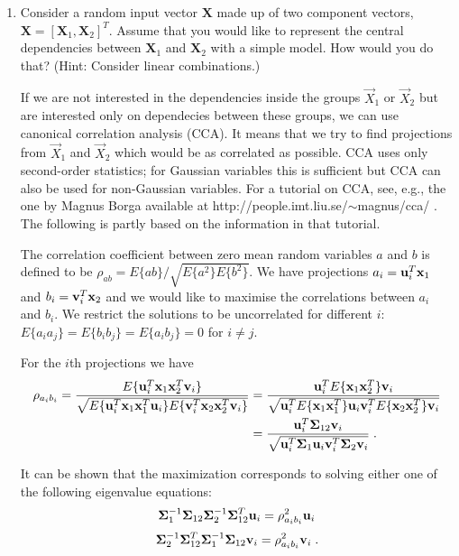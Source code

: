 \begin{enumerate}

\item Consider a random input vector $\mathbf{X}$ made up of two component vectors,
  $\mathbf{X} = [\mathbf{X}_1,\mathbf{X}_2]^T$. Assume that you would like to represent the
  central dependencies between $\mathbf{X}_1$ and $\mathbf{X}_2$ with a  simple
  model. How would you do that? (Hint: Consider linear combinations.)

  \begin{solution}

    If we are not interested in the dependencies inside the groups
    $\vec{X}_1$ or $\vec{X}_2$ but are interested only on dependecies
    between these groups, we can use canonical correlation analysis (CCA).  It
    means that we try to find projections from $\vec{X}_1$ and
    $\vec{X}_2$ which would be as correlated as possible. CCA uses only
    second-order statistics; for Gaussian variables this
    is sufficient but CCA can also be used for
    non-Gaussian variables. For a tutorial on CCA, see,
    e.g., the one by Magnus Borga available
    at http://people.imt.liu.se/$\sim$magnus/cca/ . The following is
    partly based on the information in that tutorial.

    The correlation coefficient between zero mean random variables $a$
    and $b$ is defined to be $\rho_{ab} =
    E\{ab\}/\sqrt{E\{a^2\}E\{b^2\}}$.  We have projections $a_i = \mathbf{u}_i^T
    \mathbf{x}_1$ and $b_i = \mathbf{v}_i^T \mathbf{x}_2$ and we would like to maximise the
    correlations between $a_i$ and $b_i$. We restrict the solutions to be
    uncorrelated for different $i$: $E\{a_i a_j\} = E\{b_i b_j\} = E\{a_i b_j\} = 0$
    for $i \neq j$.

    For the $i$th projections we have
    \begin{align*}\nonumber
      \rho_{a_i b_i}
      = \frac{E\{\mathbf{u}_i^T \mathbf{x}_1 \mathbf{x}_2^T \mathbf{v}_i\}}{\sqrt{E\{\mathbf{u}_i^T \mathbf{x}_1\mathbf{x}_1^T\mathbf{u}_i\} E\{\mathbf{v}_i^T \mathbf{x}_2\mathbf{x}_2^T\mathbf{v}_i\}}}
      &= \frac{\mathbf{u}_i^T E\{\mathbf{x}_1 \mathbf{x}_2^T\} \mathbf{v}_i}{\sqrt{\mathbf{u}_i^T E\{\mathbf{x}_1\mathbf{x}_1^T\}\mathbf{u}_i \mathbf{v}_i^T E\{\mathbf{x}_2\mathbf{x}_2^T\}\mathbf{v}_i}} \\
      &= \frac{\mathbf{u}_i^T \boldsymbol{\Sigma}_{12} \mathbf{v}_i}{\sqrt{\mathbf{u}_i^T \boldsymbol{\Sigma}_1\mathbf{u}_i \mathbf{v}_i^T \boldsymbol{\Sigma}_2\mathbf{v}_i}} \;.
    \end{align*}

    It can be shown that the maximization corresponds to solving either one
    of the following eigenvalue equations:
    $$
    \boldsymbol{\Sigma}_1^{-1}\boldsymbol{\Sigma}_{12}\boldsymbol{\Sigma}_2^{-1}\boldsymbol{\Sigma}_{12}^T\mathbf{u}_i=\rho^2_{a_i b_i}\mathbf{u}_i
    $$
    $$
    \boldsymbol{\Sigma}_2^{-1}\boldsymbol{\Sigma}_{12}^T\boldsymbol{\Sigma}_1^{-1}\boldsymbol{\Sigma}_{12}\mathbf{v}_i=\rho^2_{a_i b_i}\mathbf{v}_i \;.
    $$



\end{solution}
\end{enumerate}
